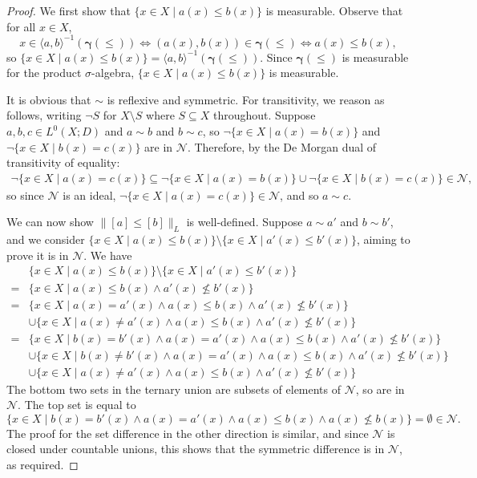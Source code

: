 \documentclass{lmcs}
\newcommand{\En}{\mathcal{N}}
\newcommand{\graph}{\pmb{\gamma}}
\newcommand{\bnot}{\lnot} %
\newcommand{\bvs}[1]{\| {#1} \|}
\begin{document}
\begin{proof}
We first show that $\{ x \in X \mid a(x) \leq b(x) \}$ is measurable. Observe that for all $x \in X$, 
\[
x \in \langle a, b \rangle^{-1}(\graph(\leq)) \Leftrightarrow (a(x),b(x)) \in \graph(\leq) \Leftrightarrow a(x) \leq b(x),
\]
so $\{ x \in X \mid a(x) \leq b(x) \} = \langle a, b \rangle^{-1}(\graph(\leq))$. Since $\graph(\leq)$ is measurable for the product $\sigma$-algebra, $\{ x \in X \mid a(x) \leq b(x) \}$ is measurable. 

It is obvious that $\sim$ is reflexive and symmetric. For transitivity, we reason as follows, writing $\bnot S$ for $X \setminus S$ where $S \subseteq X$ throughout. Suppose $a,b,c \in L^0(X;D)$ and $a \sim b$ and $b \sim c$, so $\bnot\{ x \in X \mid a(x) = b(x) \}$ and $\bnot\{x \in X \mid b(x) = c(x) \}$ are in $\En$. Therefore, by the De Morgan dual of transitivity of equality:
\begin{align*}
\bnot \{ x \in X \mid a(x) = c(x) \} \subseteq \bnot \{ x \in X \mid a(x) = b(x) \} \cup \bnot \{ x \in X \mid b(x) = c(x) \} \in \En,
\end{align*}
so since $\En$ is an ideal, $\bnot\{ x \in X \mid a(x) = c(x) \} \in \En$, and so $a \sim c$. 

We can now show $\bvs{[a] \leq [b]}_L$ is well-defined. Suppose $a \sim a'$ and $b \sim b'$, and we consider $\{ x \in X \mid a(x) \leq b(x) \} \setminus \{x \in X \mid a'(x) \leq b'(x) \}$, aiming to prove it is in $\En$. We have
\begin{align*}
& \{ x \in X \mid a(x) \leq b(x) \} \setminus \{x \in X \mid a'(x) \leq b'(x) \} \\
={} & \{ x \in X \mid a(x) \leq b(x) \land a'(x) \not\leq b'(x) \} \\
={} & \{ x \in X \mid a(x) = a'(x) \land a(x) \leq b(x) \land a'(x) \not\leq b'(x) \} \\
 &\cup \{ x \in X \mid a(x) \neq a'(x) \land a(x) \leq b(x) \land a'(x) \not\leq b'(x) \} \\
={} & \{ x \in X \mid b(x) = b'(x) \land a(x) = a'(x) \land a(x) \leq b(x) \land a'(x) \not\leq b'(x) \} \\
 &\cup \{ x \in X \mid b(x) \neq b'(x) \land a(x) = a'(x) \land a(x) \leq b(x) \land a'(x) \not\leq b'(x) \} \\
 &\cup \{ x \in X \mid a(x) \neq a'(x) \land a(x) \leq b(x) \land a'(x) \not\leq b'(x) \}
\end{align*}
The bottom two sets in the ternary union are subsets of elements of $\En$, so are in $\En$. The top set is equal to
\[
\{ x \in X \mid b(x) = b'(x) \land a(x) = a'(x) \land a(x) \leq b(x) \land a(x) \not\leq b(x) \} = \emptyset \in \En.
\]
The proof for the set difference in the other direction is similar, and since $\En$ is closed under countable unions, this shows that the symmetric difference is in $\En$, as required. 
\end{proof}
\end{document}
